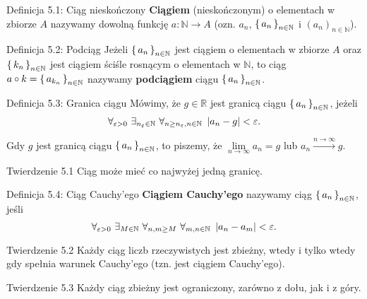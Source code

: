 \documentclass{article}
\newcommand{\hquad}{\mkern9mu}
\newcommand{\R}{\mathbb{R}}
\newcommand{\N}{\mathbb{N}}
\newcommand{\lin}[1]{\lim\limits_{n\to\infty}{#1}}
\newcommand{\arn}{\xrightarrow{n\to\infty}}
\newcommand{\seq}[1]{\set{#1_n}_{n\in\N}}
\begin{document}
\begin{defr}{Definicja 5.1: Ciąg nieskończony}
    \textbf{Ciągiem} (nieskończonym) o elementach w zbiorze \(A\)
    nazywamy dowolną funkcję $a:\N\to A$ (ozn. $a_n$, $\set{a_n}_{n\in\N}$
    i $(a_n)_{n\in\N}$).
\end{defr}

\begin{defr}{Definicja 5.2: Podciąg}
    Jeżeli $\seq{a}$ jest ciągiem o elementach w zbiorze $A$ oraz
    $\seq{k}$ jest ciągiem ściśle rosnącym o elementach w $\N$,
    to ciąg $a\circ k=\set{a_{k_n}}_{n\in\N}$ nazywamy \textbf{podciągiem}
    ciągu $\seq{a}$.
\end{defr}

\begin{defr}{Definicja 5.3: Granica ciągu}
    Mówimy, że $g\in \R$ jest granicą ciągu $\seq{a}$, jeżeli
    \begin{equation*}
        \forall_{\varepsilon>0}\ \exists_{n_\varepsilon\in\N}\ 
        \forall_{n\ge n_\varepsilon, n\in\N}\hquad
        |a_n-g|<\varepsilon.
    \end{equation*}
\end{defr}

Gdy $g$ jest granicą ciągu $\seq{a}$, to piszemy, że $\lin{a_n}=g$
lub $a_n\arn g$.

\begin{twier}{Twierdzenie 5.1}
    Ciąg może mieć co najwyżej jedną granicę.
\end{twier}

\begin{defr}{Definicja 5.4: Ciąg Cauchy'ego}
    \textbf{Ciągiem Cauchy'ego} nazywamy ciąg $\seq{a}$, jeśli
    \begin{equation*}
        \forall_{\varepsilon>0}\ \exists_{M\in\N}\
        \forall_{n,m\geq M}\ \forall_{m,n\in\N}\hquad
        |a_n-a_m|<\varepsilon.
    \end{equation*}
\end{defr}

\begin{twier}{Twierdzenie 5.2}
    Każdy ciąg liczb rzeczywistych jest zbieżny, wtedy i tylko wtedy gdy spełnia warunek Cauchy'ego (tzn. jest ciągiem Cauchy'ego).
\end{twier}

\begin{twier}{Twierdzenie 5.3}
    Każdy ciąg zbieżny jest ograniczony, zarówno z dołu, jak i z góry.
\end{twier}
\end{document}
